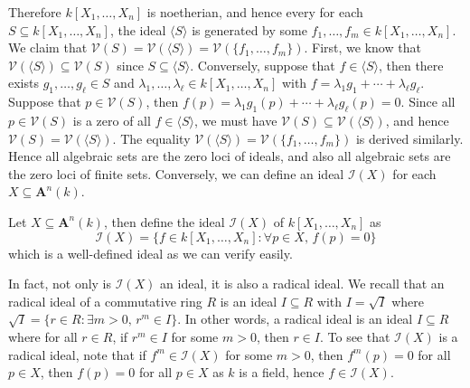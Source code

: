\documentclass[11pt]{book}
\begin{document}
Therefore $k[X_1,\dots,X_n]$ is noetherian, and hence every for each $S\subseteq k[X_1,\dots,X_n]$, the ideal $\langle S\rangle$ is generated by some $f_1,\dots,f_m\in k[X_1,\dots,X_n]$. We claim that $\mathcal{V}(S)=\mathcal{V}(\langle S\rangle)=\mathcal{V}(\{f_1,\dots,f_m\})$. First, we know that $\mathcal{V}(\langle S\rangle)\subseteq \mathcal{V}(S)$ since $S\subseteq\langle S\rangle$. Conversely, suppose that $f\in\langle S\rangle$, then there exists $g_1,\dots,g_\ell\in S$ and $\lambda_1,\dots,\lambda_\ell\in k[X_1,\dots,X_n]$ with $f=\lambda_1g_1+\cdots+\lambda_{\ell}g_{\ell}$. Suppose that $p\in \mathcal{V}(S)$, then $f(p)=\lambda_1g_1(p)+\cdots+\lambda_{\ell}g_{\ell}(p)=0$. Since all $p\in \mathcal{V}(S)$ is a zero of all $f\in \langle S\rangle$, we must have $\mathcal{V}(S)\subseteq \mathcal{V}(\langle S\rangle)$, and hence $\mathcal{V}(S)=\mathcal{V}(\langle S\rangle)$. The equality $\mathcal{V}(\langle S\rangle)=\mathcal{V}(\{f_1,\dots,f_m\})$ is derived similarly. Hence all algebraic sets are the zero loci of ideals, and also all algebraic sets are the zero loci of finite sets. Conversely, we can define an ideal $\mathcal{I}(X)$ for each $X\subseteq \mathbf A^n(k)$. 

\begin{definition}Let $X\subseteq \mathbf A^n(k)$, then define the ideal $\mathcal{I}(X)$ of $k[X_1,\dots,X_n]$ as 
\[\mathcal{I}(X)=\{f\in k[X_1,\dots,X_n]:\forall p\in X,\,f(p)=0\}\]
which is a well-defined ideal as we can verify easily.
\end{definition}
In fact, not only is $\mathcal{I}(X)$ an ideal, it is also a radical ideal. We recall that an radical ideal of a commutative ring $R$ is an ideal $I\subseteq R$ with $I=\sqrt{I}$ where $\sqrt{I}=\{r\in R:\exists m>0,\, r^m\in I\}$. In other words, a radical ideal is an ideal $I\subseteq R$ where for all $r\in R$, if $r^m\in I$ for some $m>0$, then $r\in I$. To see that $\mathcal{I}(X)$ is a radical ideal, note that if $f^m\in \mathcal{I}(X)$ for some $m>0$, then $f^m(p)=0$ for all $p\in X$, then $f(p)=0$ for all $p\in X$ as $k$ is a field, hence $f\in \mathcal{I}(X)$. 
\end{document}
